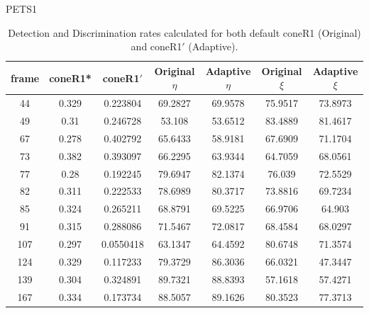 \begin{appendices}
\begin{table}
\centering
\caption{PETS1}
\caption*{Detection and Discrimination rates calculated for both default coneR1 (Original) and coneR1$'$ (Adaptive).}
\begin{tabular}{ |c|c|c|c|c|c|c| }
\hline
\textbf{frame} &  \textbf{coneR1*} &  \textbf{coneR1$'$} &  \textbf{Original $\eta$} &  \textbf{Adaptive $\eta$} &  \textbf{Original $\xi$} &  \textbf{Adaptive $\xi$} \\
\hline
\hline
44 &  0.329 &  0.223804 &  69.2827 &  69.9578 &  75.9517 &  73.8973 \\
\hline
49 &  0.31 &  0.246728 &  53.108 &  53.6512 &  83.4889 &  81.4617 \\
\hline
67 &  0.278 &  0.402792 &  65.6433 &  58.9181 &  67.6909 &  71.1704 \\
\hline
73 &  0.382 &  0.393097 &  66.2295 &  63.9344 &  64.7059 &  68.0561 \\
\hline
77 &  0.28 &  0.192245 &  79.6947 &  82.1374 &  76.039 &  72.5529 \\
\hline
82 &  0.311 &  0.222533 &  78.6989 &  80.3717 &  73.8816 &  69.7234 \\
\hline
85 &  0.324 &  0.265211 &  68.8791 &  69.5225 &  66.9706 &  64.903 \\
\hline
91 &  0.315 &  0.288086 &  71.5467 &  72.0817 &  68.4584 &  68.0297 \\
\hline
107 &  0.297 &  0.0550418 &  63.1347 &  64.4592 &  80.6748 &  71.3574 \\
\hline
124 &  0.329 &  0.117233 &  79.3729 &  86.3036 &  66.0321 &  47.3447 \\
\hline
139 &  0.304 &  0.324891 &  89.7321 &  88.8393 &  57.1618 &  57.4271 \\
\hline
167 &  0.334 &  0.173734 &  88.5057 &  89.1626 &  80.3523 &  77.3713 \\
\hline
\end{tabular}


\end{table}
\end{appendices}

